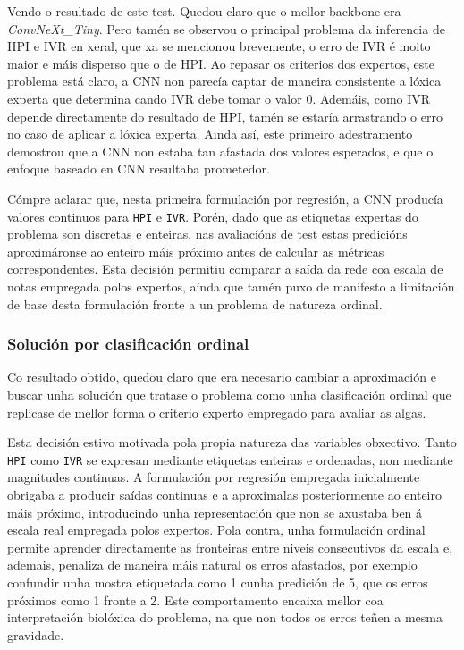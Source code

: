Vendo o resultado de este test. Quedou claro que o mellor backbone era \textit{ConvNeXt\_Tiny}. Pero tamén se
observou o principal problema da inferencia de HPI e IVR en xeral, que xa se mencionou brevemente, o erro
de IVR é moito maior e máis disperso que o de HPI. Ao repasar os criterios dos expertos, este problema está
claro, a CNN non parecía captar de maneira consistente a lóxica experta que determina cando IVR debe tomar o valor 0. Ademáis, como IVR depende directamente do
resultado de HPI, tamén se estaría arrastrando o erro no caso de aplicar a lóxica experta. Ainda así, este primeiro 
adestramento demostrou que a CNN non estaba tan afastada dos valores esperados, e que o enfoque baseado en CNN resultaba prometedor.

Cómpre aclarar que, nesta primeira formulación por regresión, a CNN producía valores continuos para
\texttt{HPI} e \texttt{IVR}. Porén, dado que as etiquetas expertas do problema son discretas e
enteiras, nas avaliacións de test estas predicións aproximáronse ao enteiro máis próximo antes de
calcular as métricas correspondentes. Esta decisión permitiu comparar a saída da rede coa escala de
notas empregada polos expertos, aínda que tamén puxo de manifesto a limitación de base desta
formulación fronte a un problema de natureza ordinal.

\subsubsection{Solución por clasificación ordinal}

Co resultado obtido, quedou claro que era necesario cambiar a aproximación e buscar unha solución que
tratase o problema como unha clasificación ordinal que replicase de mellor forma o criterio experto 
empregado para avaliar as algas.

Esta decisión estivo motivada pola propia natureza das variables obxectivo. Tanto \texttt{HPI} como
\texttt{IVR} se expresan mediante etiquetas enteiras e ordenadas, non mediante magnitudes continuas. A
formulación por regresión empregada inicialmente obrigaba a producir saídas continuas e a
aproximalas posteriormente ao enteiro máis próximo, introducindo unha representación que non se
axustaba ben á escala real empregada polos expertos. Pola contra, unha formulación ordinal permite
aprender directamente as fronteiras entre niveis consecutivos da escala e, ademais, penaliza de
maneira máis natural os erros afastados, por exemplo confundir unha mostra etiquetada como 1 cunha
predición de 5, que os erros próximos como 1 fronte a 2. Este comportamento encaixa mellor coa
interpretación biolóxica do problema, na que non todos os erros teñen a mesma gravidade.

